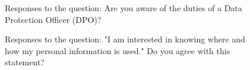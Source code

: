 
\begin{figure}
    \centering
    \caption{Responses to the question: Are you aware of the duties of a Data Protection Officer (DPO)?}
    \label{fig:aware_dpo}
\end{figure}

\begin{figure}
    \centering
    \caption{Responses to the question: "I am interested in knowing where and how my personal information is used." Do you agree with this statement?}
    \label{fig:interested_where_how_information_used}
\end{figure}

